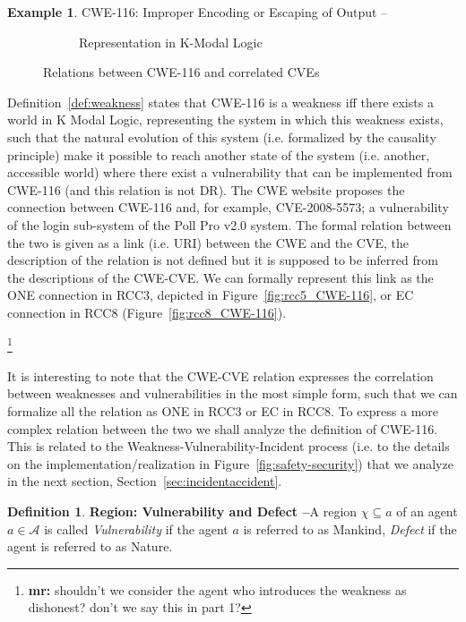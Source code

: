 \documentclass{article}
\newcommand{\fixnote}[2]{\textbf{\color{red}{FIX}}\footnote{{\bf #1:} #2}}
\theoremstyle{definition}
\newtheorem{definition}{Definition}[section]
\theoremstyle{corollary}
\theoremstyle{lemma}
\theoremstyle{theorem}
\theoremstyle{theorem}
\newtheorem{example}{Example}
\newcommand{\region}{\chi}
\newcommand{\agentuniverse}{\mathcal{A}}
\newcommand{\agent}{a}
\begin{document}
\begin{example}{CWE-116: Improper Encoding or Escaping of Output\autocite{CWE-116} --}
\begin{figure}[t]
\begin{subfigure}[b]{\textwidth}
		\caption{Representation in K-Modal Logic}
		\label{fig:KML_CWE-116}
	\end{subfigure}
	\caption{Relations between CWE-116 and correlated CVEs}
\end{figure}
Definition~\ref{def:weakness} states that CWE-116 is a weakness iff there exists a world in
K Modal Logic, representing the system in which this weakness exists, 
such that the natural evolution of this system (i.e. formalized by the causality principle) 
make it possible to reach another state of the system (i.e. another, accessible world)
where there exist a vulnerability that can be implemented from CWE-116 (and this relation 
is not DR). The CWE website proposes the connection between CWE-116 and, for example, 
CVE-2008-5573; a vulnerability of the login sub-system 
of the Poll Pro v2.0\autocite{pollpro} system.
The formal relation between the two is given as a link (i.e. URI) between the CWE and
the CVE, the description of the relation is not defined but it is supposed to be
inferred from the descriptions of the CWE-CVE. 
We can formally represent this link as the ONE connection in RCC3, depicted in 
Figure~\ref{fig:rcc5_CWE-116}, or EC connection in RCC8 (Figure~\ref{fig:rcc8_CWE-116}).

\fixnote{mr}{shouldn't we consider the agent who introduces the weakness as dishonest? don't we say this in part 1?}
\end{example}

It is interesting to note that the CWE-CVE relation expresses the correlation
between weaknesses and vulnerabilities in the most simple form, such that we
can formalize all the relation as ONE in RCC3 or EC in RCC8.  To express a more
complex relation between the two we shall analyze the definition of CWE-116.
This is related to the Weakness-Vulnerability-Incident process (i.e. to the
details on the implementation/realization in Figure~\ref{fig:safety-security})
that we analyze in the next section, Section~\ref{sec:incidentaccident}.

\begin{definition}{\bf Region: Vulnerability and Defect --}\label{def:vulnerability-defect}
A region $\region\subseteq\agent$ of an agent $\agent\in\agentuniverse$ is
	called \emph{Vulnerability} if the agent $\agent$ is referred to as Mankind, 
	\emph{Defect} if the agent is referred to as Nature.
\end{definition}
\end{document}
